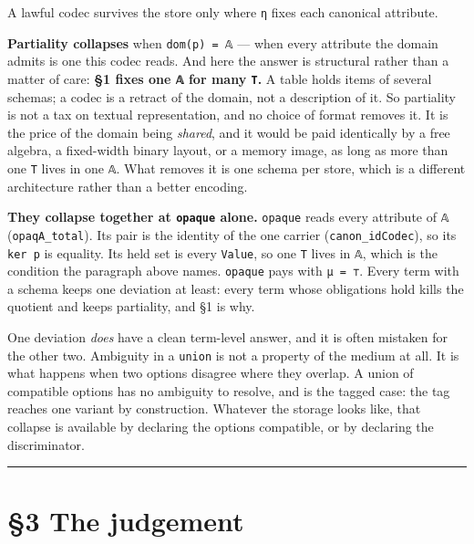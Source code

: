 \begin{theorem}
\label{thm:store-heldfree}
\leanok
A lawful codec survives the store only where \texttt{η} fixes each canonical attribute.
\end{theorem}

\textbf{Partiality collapses} when \texttt{dom(p)\ =\ 𝔸} — when every attribute the domain admits is one this
codec reads. And here the answer is structural rather than a matter of care: \textbf{§1 fixes one \texttt{𝔸}
for many \texttt{T}.} A table holds items of several schemas; a codec is a retract of the domain, not a
description of it. So partiality is not a tax on textual representation, and no choice of format
removes it. It is the price of the domain being \emph{shared}, and it would be paid identically by a
free algebra, a fixed-width binary layout, or a memory image, as long as more than one \texttt{T} lives in
one \texttt{𝔸}. What removes it is one schema per store, which is a different architecture rather than a
better encoding.

\textbf{They collapse together at \texttt{opaque} alone.} \texttt{opaque} reads every attribute of \texttt{𝔸}
(\texttt{opaqA\_total}). Its pair is the identity of the one carrier (\texttt{canon\_idCodec}), so its
\texttt{ker\ p} is equality. Its held set is every \texttt{Value}, so one \texttt{T} lives in \texttt{𝔸}, which is the
condition the paragraph above names. \texttt{opaque} pays with \texttt{μ\ =\ ⊤}. Every term with a schema keeps one deviation at least:
every term whose obligations hold kills the quotient and keeps partiality, and §1 is why.

One deviation \emph{does} have a clean term-level answer, and it is often mistaken for the other
two. Ambiguity in a \texttt{union} is not a property of the medium at all. It is what happens when
two options disagree where they overlap. A union of compatible options has no ambiguity to resolve,
and  is the tagged case: the tag reaches one variant by construction.
Whatever the storage looks like, that collapse is available by declaring the options compatible,
or by declaring the discriminator.

\begin{center}\rule{0.5\linewidth}{0.5pt}\end{center}

\section{§3 The judgement}\label{3-the-judgement}

